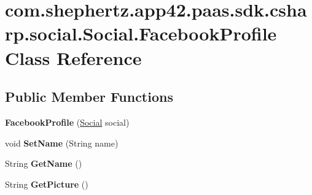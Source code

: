 \hypertarget{classcom_1_1shephertz_1_1app42_1_1paas_1_1sdk_1_1csharp_1_1social_1_1_social_1_1_facebook_profile}{\section{com.\+shephertz.\+app42.\+paas.\+sdk.\+csharp.\+social.\+Social.\+Facebook\+Profile Class Reference}
\label{classcom_1_1shephertz_1_1app42_1_1paas_1_1sdk_1_1csharp_1_1social_1_1_social_1_1_facebook_profile}
}
\subsection*{Public Member Functions}
\begin{DoxyCompactItemize}
\item 
\hypertarget{classcom_1_1shephertz_1_1app42_1_1paas_1_1sdk_1_1csharp_1_1social_1_1_social_1_1_facebook_profile_a98d09baec7d7236e1ea5c7c15f646e8e}{{\bfseries Facebook\+Profile} (\hyperlink{classcom_1_1shephertz_1_1app42_1_1paas_1_1sdk_1_1csharp_1_1social_1_1_social}{Social} social)}\label{classcom_1_1shephertz_1_1app42_1_1paas_1_1sdk_1_1csharp_1_1social_1_1_social_1_1_facebook_profile_a98d09baec7d7236e1ea5c7c15f646e8e}

\item 
\hypertarget{classcom_1_1shephertz_1_1app42_1_1paas_1_1sdk_1_1csharp_1_1social_1_1_social_1_1_facebook_profile_a87882644bd56845e520428e529a5d7e2}{void {\bfseries Set\+Name} (String name)}\label{classcom_1_1shephertz_1_1app42_1_1paas_1_1sdk_1_1csharp_1_1social_1_1_social_1_1_facebook_profile_a87882644bd56845e520428e529a5d7e2}

\item 
\hypertarget{classcom_1_1shephertz_1_1app42_1_1paas_1_1sdk_1_1csharp_1_1social_1_1_social_1_1_facebook_profile_a496630760bfa7ef3fd312bb465e7cb8b}{String {\bfseries Get\+Name} ()}\label{classcom_1_1shephertz_1_1app42_1_1paas_1_1sdk_1_1csharp_1_1social_1_1_social_1_1_facebook_profile_a496630760bfa7ef3fd312bb465e7cb8b}

\item 
\hypertarget{classcom_1_1shephertz_1_1app42_1_1paas_1_1sdk_1_1csharp_1_1social_1_1_social_1_1_facebook_profile_aa45c499b7c6309c0c948eee2f1a6a787}{String {\bfseries Get\+Picture} ()}\label{classcom_1_1shephertz_1_1app42_1_1paas_1_1sdk_1_1csharp_1_1social_1_1_social_1_1_facebook_profile_aa45c499b7c6309c0c948eee2f1a6a787}


\end{DoxyCompactItemize}

